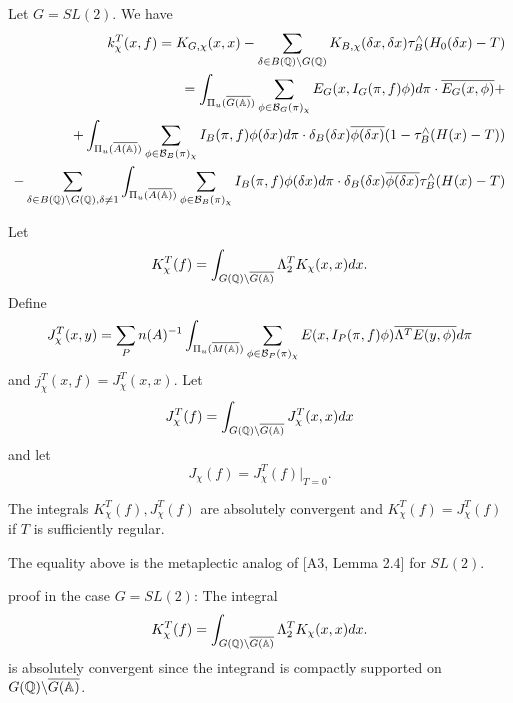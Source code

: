 \begin{example}
Let $G=SL(2)$. We have 
\begin{eqnarray*}
k_\chi ^T(x,f)
=K_{G,\chi }(x,x)-\sum_{\delta \in B(\mathbb{Q} )\backslash G(\Bbb{Q})}
K_{B,\chi }(\delta x,\delta x)
\tau _B^{\wedge }(H_0(\delta x)-T) \\
=\int_{\Pi _u(\overline{G(\mathbb{A} )})}
\sum_{\phi \in {\cal{B}}_G(\pi )_\chi}
E_G(x,I_G(\pi ,f)\phi )d\pi \cdot \overline{E_G(x,\phi )}+ \\
+\int_{\Pi _u(\overline{A(\mathbb{A} )})}
\sum_{\phi \in {\cal{B}}_B(\pi )_\chi }
I_B(\pi,f)\phi (\delta x)d\pi \cdot \delta _B(\delta x)
\overline{\phi (\delta x)}(1-\tau _B^{\wedge }(H(x)-T)) \\
-\sum_{ \delta \in B(\mathbb{Q} )\backslash G(\mathbb{Q} ), \delta \neq 1 }
\int_{\Pi _u(\overline{A(\mathbb{A} )})}
\sum_{\phi \in {\cal{B}}_B(\pi )_\chi }I_B(\pi,f)
\phi (\delta x)d\pi \cdot \delta _B(\delta x)
\overline{\phi (\delta x)}\tau _B^{\wedge }(H(x)-T)
\end{eqnarray*}
\end{example}

Let 
\begin{equation}
K_\chi ^T(f)=\int_{G(\mathbb{Q} )\backslash \overline{G(\mathbb{A} )}}
\Lambda _2^TK_\chi (x,x)dx.
\end{equation}
Define 
\begin{equation}
J_\chi ^T(x,y)=\sum_Pn(A)^{-1}
\int_{\Pi _u(\overline{M(\mathbb{A} )})}
\sum_{\phi \in {\cal{B}}_P(\pi )_\chi }
E(x,I_P(\pi ,f)\phi )\overline{\Lambda ^TE(y,\phi )}d\pi
\end{equation}
and $j_\chi ^T(x,f)=J_\chi ^T(x,x)$. Let 
\[
J_\chi ^T(f)
=\int_{G(\mathbb{Q} )\backslash \overline{G(\mathbb{A} )}}
J_\chi ^T(x,x)dx 
\]
and let
\begin{equation}
J_\chi (f)=J_\chi ^T(f)|_{T=0}.
\end{equation}

\begin{lemma}
The integrals $K_\chi ^T(f),J_\chi ^T(f)$ are absolutely convergent and $%
K_\chi ^T(f)=J_\chi ^T(f)$ if $T$ is sufficiently regular.
\end{lemma}

\begin{remark}
The equality above is the metaplectic analog of [A3, Lemma 2.4]
for $SL(2)$.
\end{remark}

proof in the case $G=SL(2)$: The integral 
\[
K_\chi ^T(f)
=\int_{G(\mathbb{Q} )\backslash \overline{G(\mathbb{A} )}}
\Lambda _2^TK_\chi (x,x)dx. 
\]
is absolutely convergent since the integrand is compactly
supported on $G(\mathbb{Q} )\backslash \overline{G(\mathbb{A} )}$.

